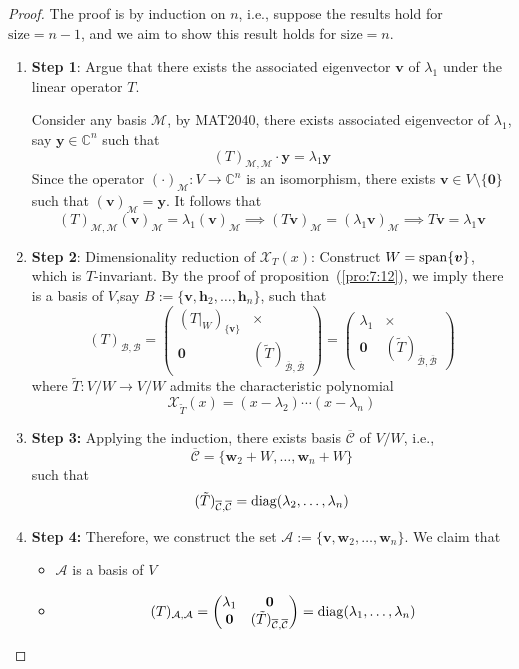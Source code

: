 \begin{proof}
The proof is by induction on $n$, i.e., suppose the results hold for $\text{size}=n-1$, and we aim to show this result holds for $\text{size}=n$.
\begin{enumerate}
\item
\textbf{Step 1}:
Argue that there exists the associated eigenvector $\bm v$ of $\lambda_1$ under the linear operator $T$.

Consider any basis $\mathcal{M}$, by MAT2040, there exists associated eigenvector of $\lambda_1$, say $\bm y\in\mathbb{C}^n$ such that
\[
(T)_{\mathcal{M},\mathcal{M}}\cdot\bm y = \lambda_1\bm y
\]
Since the operator $(\cdot)_{\mathcal{M}}:V\to\mathbb{C}^n$ is an isomorphism, there exists $\bm v\in V\setminus\{\bm0\}$ such that $(\bm v)_{\mathcal{M}} = \bm y$. It follows that
\[
(T)_{\mathcal{M},\mathcal{M}}(\bm v)_{\mathcal{M}} = \lambda_1(\bm v)_{\mathcal{M}}\implies
(T\bm v)_{\mathcal{M}} = (\lambda_1\bm v)_{\mathcal{M}}\implies
T\bm v = \lambda_1\bm v
\]
\item
\textbf{Step 2}:
Dimensionality reduction of $\mathcal{X}_T(x)$:
Construct $W=\operatorname{span}\{\bm v\}$, which is $T$-invariant.
By the proof of proposition~(\ref{pro:7:12}), we imply there is a basis of $V$,say $B:=\{\bm v,\bm h_2,\dots,\bm h_n\}$, such that
\[
(T)_{\mathcal{B},\mathcal{B}}=\begin{pmatrix}
(T|_W)_{\{\bm v\}}&\times\\\bm0&(\tilde{T})_{\overline{\mathcal{B}},\overline{\mathcal{B}}}
\end{pmatrix}
=
\begin{pmatrix}
\lambda_1&\times\\\bm0&(\tilde{T})_{\overline{\mathcal{B}},\overline{\mathcal{B}}}
\end{pmatrix}
\]
where $\tilde{T}:V/W\to V/W$ admits the characteristic polynomial
\[
\mathcal{X}_{\tilde{T}}(x) = (x-\lambda_2)\cdots(x-\lambda_n)
\]
\item
\textbf{Step 3:}
Applying the induction, 
there exists basis $\overline{\mathcal{C}}$ of $V/W$, i.e.,
\[
\overline{\mathcal{C}} = \{\bm w_2+W,\dots,\bm w_n+W\}
\]
such that
\[
(\tilde{T})_{\overline{\mathcal{C}},\overline{\mathcal{C}}}
=
\operatorname{diag}(\lambda_2,\dots,\lambda_n)
\]
\item
\textbf{Step 4:}
Therefore, we construct the set $\mathcal{A}:=
\{\bm v,\bm w_2,\dots,\bm w_n\}$.
We claim that 
\begin{itemize}
\item
$\mathcal{A}$ is a basis of $V$
\item
\[
(T)_{\mathcal{A},\mathcal{A}}=\begin{pmatrix}
\lambda_1&\bm0\\\bm0&(\tilde{T})_{\overline{\mathcal{C}},\overline{\mathcal{C}}}
\end{pmatrix}=\operatorname{diag}(\lambda_1,\dots,\lambda_n)
\]
\end{itemize}
\end{enumerate}
\end{proof}

